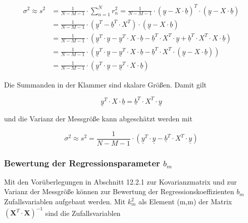\begin{equation}\label{eq:thirteenfourtyone}
\begin{split}
\sigma ^{2} \approx s^{2}  & =\frac{1}{N-M-1} \cdot \sum _{n=1}^{N}r_{n}^{2}  =\frac{1}{N-M-1} \cdot \left(\underline{y}-X\cdot \underline{b}\right)^{T} \cdot \left(\underline{y}-X\cdot \underline{b}\right) \\ 
& = \frac{1}{N-M-1} \cdot \left(\underline{y}^{T} -\underline{b}^{T} \cdot X^{T} \right)\cdot \left(\underline{y}-X\cdot \underline{b}\right) \\
& = \frac{1}{N-M-1} \cdot \left(\underline{y}^{T} \cdot \underline{y}-\underline{y}^{T} \cdot X\cdot \underline{b}-\underline{b}^{T} \cdot X^{T} \cdot \underline{y}+\underline{b}^{T} \cdot X^{T} \cdot X\cdot \underline{b}\right) \\
& = \frac{1}{N-M-1} \cdot \left(\underline{y}^{T} \cdot \underline{y}-\underline{y}^{T} \cdot X\cdot \underline{b}-\underline{b}^{T} \cdot X^{T} \cdot \left(\underline{y}-X\cdot \underline{b}\right)\right) \\ 
& = \frac{1}{N-M-1} \cdot \left(\underline{y}^{T} \cdot \underline{y}-\underline{y}^{T} \cdot X\cdot \underline{b}\right)
\end{split}
\end{equation}

\noindent Die Summanden in der Klammer sind skalare Gr\"{o}{\ss}en. Damit gilt

\begin{equation}\label{eq:thirteenfourtytwo}
\underline{y}^{T} \cdot X\cdot \underline{b}=\underline{b}^{T} \cdot X^{T} \cdot \underline{y}
\end{equation}

\noindent und die Varianz der Messgr\"{o}{\ss}e kann abgesch\"{a}tzt werden mit

\begin{equation}\label{eq:thirteenfourtythree}
\sigma ^{2} \approx s^{2} =\frac{1}{N-M-1} \cdot \left(\underline{y}^{T} \cdot \underline{y}-\underline{b}^{T} \cdot X^{T} \cdot \underline{y}\right)
\end{equation}

\subsubsection{Bewertung der Regressionsparameter $b_{m}$}

\noindent Mit den Vor\"{u}berlegungen in Abschnitt 12.2.1 zur Kovarianzmatrix und zur Varianz der Messgr\"{o}{\ss}e k\"{o}nnen zur Bewertung der Regressionskoeffizienten $b_{m}$ Zufallsvariablen aufgebaut werden. Mit $k_{m}^{2}$ als Element (m,m) der Matrix $(\textbf{X}^{T}\cdot \textbf{X})^{-1}$ sind die Zufallsvariablen

